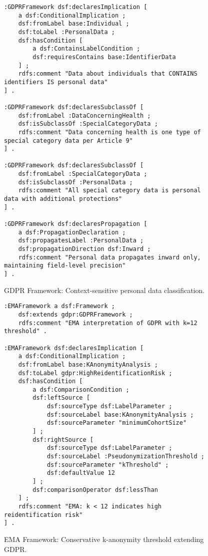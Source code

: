 \documentclass{IOS-Book-Article}
\begin{document}
\begin{figure}[ht]
\begin{lstlisting}[basicstyle=\ttfamily, frame=none]
:GDPRFramework dsf:declaresImplication [
    a dsf:ConditionalImplication ;
    dsf:fromLabel base:Individual ;
    dsf:toLabel :PersonalData ;
    dsf:hasCondition [
        a dsf:ContainsLabelCondition ;
        dsf:requiresContains base:IdentifierData
    ] ;
    rdfs:comment "Data about individuals that CONTAINS identifiers IS personal data"
] .

:GDPRFramework dsf:declaresSubclassOf [
    dsf:fromLabel :DataConcerningHealth ;
    dsf:isSubclassOf :SpecialCategoryData ;
    rdfs:comment "Data concerning health is one type of special category data per Article 9"
] .

:GDPRFramework dsf:declaresSubclassOf [
    dsf:fromLabel :SpecialCategoryData ;
    dsf:isSubclassOf :PersonalData ;
    rdfs:comment "All special category data is personal data with additional protections"
] .

:GDPRFramework dsf:declaresPropagation [
    a dsf:PropagationDeclaration ;
    dsf:propagatesLabel :PersonalData ;
    dsf:propagationDirection dsf:Inward ;
    rdfs:comment "Personal data propagates inward only, maintaining field-level precision"
] .
\end{lstlisting}
\caption{GDPR Framework: Context-sensitive personal data classification.}
\label{fig:appendix-gdpr}
\end{figure}

\begin{figure}[ht]
\begin{lstlisting}[basicstyle=\ttfamily, frame=none]
:EMAFramework a dsf:Framework ;
    dsf:extends gdpr:GDPRFramework ;
    rdfs:comment "EMA interpretation of GDPR with k=12 threshold" .

:EMAFramework dsf:declaresImplication [
    a dsf:ConditionalImplication ;
    dsf:fromLabel base:KAnonymityAnalysis ;
    dsf:toLabel gdpr:HighReidentificationRisk ;
    dsf:hasCondition [
        a dsf:ComparisonCondition ;
        dsf:leftSource [
            dsf:sourceType dsf:LabelParameter ;
            dsf:sourceLabel base:KAnonymityAnalysis ;
            dsf:sourceParameter "minimumCohortSize"
        ] ;
        dsf:rightSource [
            dsf:sourceType dsf:LabelParameter ;
            dsf:sourceLabel :PseudonymizationThreshold ;
            dsf:sourceParameter "kThreshold" ;
            dsf:defaultValue 12
        ] ;
        dsf:comparisonOperator dsf:lessThan
    ] ;
    rdfs:comment "EMA: k < 12 indicates high reidentification risk"
] .
\end{lstlisting}
\caption{EMA Framework: Conservative k-anonymity threshold extending GDPR.}
\label{fig:appendix-ema}
\end{figure}
\end{document}
